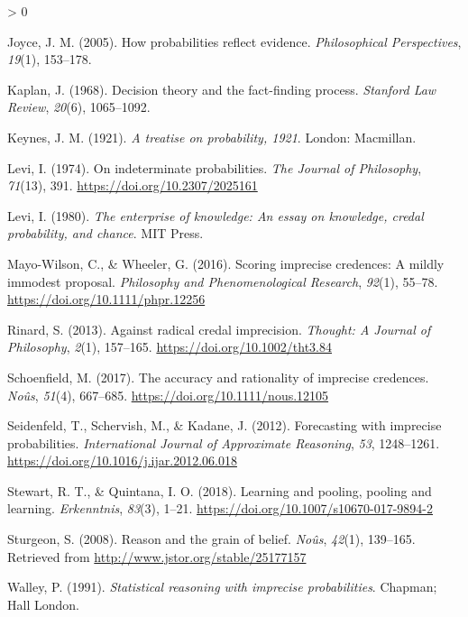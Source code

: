 \documentclass[
  10pt,
  dvipsnames,enabledeprecatedfontcommands]{scrartcl}
\newlength{\cslhangindent}
\newenvironment{CSLReferences}[2] %
 {%
  \setlength{\parindent}{0pt}
  \ifodd #1 \everypar{\setlength{\hangindent}{\cslhangindent}}\ignorespaces\fi
  \ifnum #2 > 0
  \setlength{\parskip}{#2\baselineskip}
  \fi
 }%
 {}
\begin{document}
\begin{CSLReferences}{1}{0}
\leavevmode\hypertarget{ref-joyce2005probabilities}{}%
Joyce, J. M. (2005). How probabilities reflect evidence.
\emph{Philosophical Perspectives}, \emph{19}(1), 153--178.

\leavevmode\hypertarget{ref-Kaplan1968decision}{}%
Kaplan, J. (1968). Decision theory and the fact-finding process.
\emph{Stanford Law Review}, \emph{20}(6), 1065--1092.

\leavevmode\hypertarget{ref-keynes1921treatise}{}%
Keynes, J. M. (1921). \emph{A treatise on probability, 1921}. London:
Macmillan.

\leavevmode\hypertarget{ref-Levi1974ideterminate}{}%
Levi, I. (1974). On indeterminate probabilities. \emph{The Journal of
Philosophy}, \emph{71}(13), 391. \url{https://doi.org/10.2307/2025161}

\leavevmode\hypertarget{ref-Levi1980enterprise}{}%
Levi, I. (1980). \emph{The enterprise of knowledge: An essay on
knowledge, credal probability, and chance}. MIT Press.

\leavevmode\hypertarget{ref-Mayo-Wilson2016scoring}{}%
Mayo-Wilson, C., \& Wheeler, G. (2016). Scoring imprecise credences: A
mildly immodest proposal. \emph{Philosophy and Phenomenological
Research}, \emph{92}(1), 55--78.
\url{https://doi.org/10.1111/phpr.12256}

\leavevmode\hypertarget{ref-Rinard2013against}{}%
Rinard, S. (2013). Against radical credal imprecision. \emph{Thought: A
Journal of Philosophy}, \emph{2}(1), 157--165.
\url{https://doi.org/10.1002/tht3.84}

\leavevmode\hypertarget{ref-Schoenfield2017accuracy}{}%
Schoenfield, M. (2017). The accuracy and rationality of imprecise
credences. \emph{Noûs}, \emph{51}(4), 667--685.
\url{https://doi.org/10.1111/nous.12105}

\leavevmode\hypertarget{ref-seidenfeld2012forecasting}{}%
Seidenfeld, T., Schervish, M., \& Kadane, J. (2012). Forecasting with
imprecise probabilities. \emph{International Journal of Approximate
Reasoning}, \emph{53}, 1248--1261.
\url{https://doi.org/10.1016/j.ijar.2012.06.018}

\leavevmode\hypertarget{ref-Stewart2018pooling}{}%
Stewart, R. T., \& Quintana, I. O. (2018). Learning and pooling, pooling
and learning. \emph{Erkenntnis}, \emph{83}(3), 1--21.
\url{https://doi.org/10.1007/s10670-017-9894-2}

\leavevmode\hypertarget{ref-Sturgeon2008grain}{}%
Sturgeon, S. (2008). Reason and the grain of belief. \emph{No{û}s},
\emph{42}(1), 139--165. Retrieved from
\url{http://www.jstor.org/stable/25177157}

\leavevmode\hypertarget{ref-walley1991statistical}{}%
Walley, P. (1991). \emph{Statistical reasoning with imprecise
probabilities}. Chapman; Hall London.

\end{CSLReferences}
\end{document}

